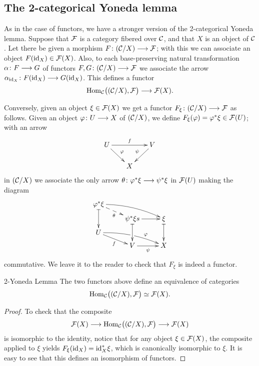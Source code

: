 \begin{3   FIBERED CATEGORIES}
\begin{3.6 Objects as fibcats and the 2-Yoneda}
\subsection{The 2-categorical Yoneda lemma}

As in the case of functors, we have a stronger version of the 2-categorical Yoneda lemma. Suppose that $\mathcal{F}$ is a category fibered over $\mathcal{C}$, and that $X$ is an object of $\mathcal{C}$. Let there be given a morphism $F \colon (\cC/X) \arr \cF$; with this we can associate an object $F(\mathrm{id}_X) \in \mathcal{F}(X)$. Also, to each base-preserving natural transformation $\alpha\colon F \arr G$ of functors $F, G \colon (\cC/X) \arr \cF$ we associate the arrow $\alpha_{\id_X} \colon F(\id_X) \arr G(\id_X)$. This defines a functor
   \[
   \hom_{\cC}\bigl((\cC/X), \cF\bigr)
   \arr \cF(X).
   \]

Conversely, given an object $\xi \in \mathcal{F}(X)$ we get a functor $F_\xi \colon (\cC/X) \arr \cF$ as follows. Given an object $\phi\colon U \arr X$ of $(\mathcal{C}/X)$, we define $F_\xi (\varphi) = \varphi^* \xi \in \mathcal{F}(U)$; with an arrow
   \[
    \xymatrix@-6pt{
   U\ar[rd]^\phi\ar[rr]^f&&V\ar[ld]_\psi\\
   &X&
   }
   \]
in $(\mathcal{C}/X)$ we associate the only arrow $\theta \colon \phi^* \xi \arr \psi^* \xi$ in $\mathcal{F}(U)$ making the diagram 
   \[
   \xymatrix@R=6pt{{\phi^* \xi}{}\ar@{|->}[dd]
   \ar@{-->}[rd]_\theta
   \ar@/^/[rrd] \\
   & \psi^*\xi\ar@{|->}[dd]\ar[r]s
   &\xi\ar@{|->}[dd] \\
   U\ar[rd]_f\ar@/^/[rrd]|(.505)\hole^>>>>>\phi\\
   & V \ar[r]_\psi
   & X
   }
   \]
commutative. We leave it to the reader to check that $F_\xi$ is indeed a functor.

\begin{named}{2-Yoneda Lemma}\label{2-yoneda}
%
The two functors above define an equivalence of categories
   \[
   \operatorname{Hom}_{\mathcal{C}}\bigl((\mathcal{C}/X), \mathcal{F}\bigr)
   \simeq \mathcal{F}(X).
   \]
\end{named}

\begin{proof}
To check that the composite
   \[
   \cF(X) \arr 
   \hom_{\cC}\bigl((\cC/X), \cF\bigr)
   \arr \cF(X)
   \]
is isomorphic to the identity, notice that for any object $\xi \in \mathcal{F}(X)$, the composite applied to $\xi$ yields $F_\xi (\mathrm{id}_{X}) = \mathrm{id}_X^* \xi$, which is canonically isomorphic to $\xi$. It is easy to see that this defines an isomorphism of functors.


\end{proof}
\end{3.6 Objects as fibcats and the 2-Yoneda}
\end{3   FIBERED CATEGORIES}
